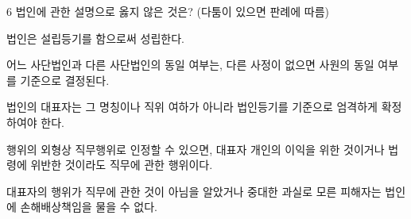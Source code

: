 \begin{question}{6}
법인에 관한 설명으로 옳지 않은 것은? (다툼이 있으면 판례에 따름)
\begin{choices}
  \item 법인은 설립등기를 함으로써 성립한다.
  \item 어느 사단법인과 다른 사단법인의 동일 여부는, 다른 사정이 없으면 사원의 동일 여부를 기준으로 결정된다.
  \item 법인의 대표자는 그 명칭이나 직위 여하가 아니라 법인등기를 기준으로 엄격하게 확정하여야 한다.
  \item 행위의 외형상 직무행위로 인정할 수 있으면, 대표자 개인의 이익을 위한 것이거나 법령에 위반한 것이라도 직무에 관한 행위이다.
  \item 대표자의 행위가 직무에 관한 것이 아님을 알았거나 중대한 과실로 모른 피해자는 법인에 손해배상책임을 물을 수 없다.
\end{choices}
\end{question}
